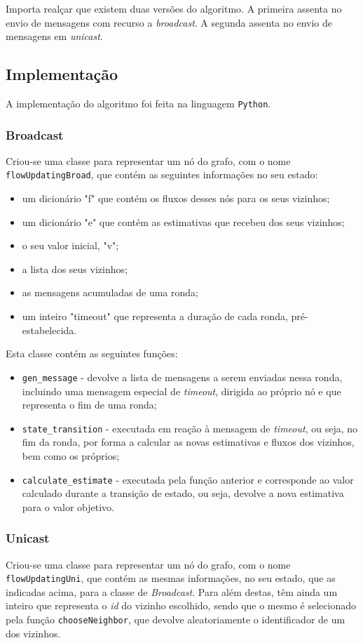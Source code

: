 \documentclass[a4paper]{article}
\begin{document}
{	Importa realçar que existem duas versões do algoritmo. A primeira assenta no envio de mensagens com recurso a \textit{broadcast}.
	A segunda assenta no envio de mensagens em \textit{unicast}.


	\subsection{Implementação} \label{subsec:Implementation}
	A implementação do algoritmo foi feita na linguagem \texttt{Python}.

		\subsubsection{Broadcast}
		Criou-se uma classe para representar um nó do grafo, com o nome \texttt{flowUpdatingBroad}, que contém as seguintes informações no seu estado:
		\begin{itemize}
			\item um dicionário "f" que contém os fluxos desses nós para os seus vizinhos;
			\item um dicionário "e" que contém as estimativas que recebeu dos seus vizinhos;
			\item o seu valor inicial, "v";
			\item a lista dos seus vizinhos;
			\item as mensagens acumuladas de uma ronda;
			\item um inteiro "timeout" que representa a duração de cada ronda, pré-estabelecida.
		\end{itemize}

		Esta classe contém as seguintes funções:
		\begin{itemize}
			\item \texttt{gen_message} - devolve a lista de mensagens a serem enviadas nessa ronda, incluindo uma mensagem especial de \textit{timeout}, dirigida ao próprio nó e que representa o fim de uma ronda;
			\item \texttt{state_transition} - executada em reação à mensagem de \textit{timeout}, ou seja, no fim da ronda, por forma a calcular as novas estimativas e fluxos dos vizinhos, bem como os próprios;
			\item \texttt{calculate_estimate} - executada pela função anterior e corresponde ao valor calculado durante a transição de estado, ou seja, devolve a nova estimativa para o valor objetivo.
		\end{itemize}

		\subsubsection{Unicast}
		Criou-se uma classe para representar um nó do grafo, com o nome \texttt{flowUpdatingUni}, que contém as mesmas informações, no seu estado, que as indicadas acima, para a classe de \textit{Broadcast}.
		Para além destas, têm ainda um inteiro que representa o \textit{id} do vizinho escolhido, sendo que o mesmo é selecionado pela função \texttt{chooseNeighbor}, que devolve aleatoriamente o identificador de um dos vizinhos.

}
\end{document}
